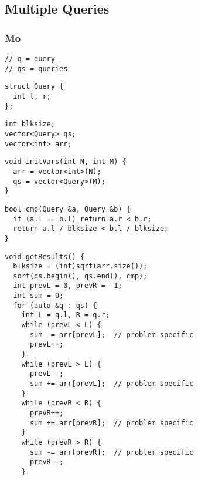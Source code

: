 \documentclass[twoside]{article}
\begin{document}
\begin{multicols*}{2}
\subsectionfont{\bfseries\sffamily\centering\LARGE}
\vspace{0em}
\subsection*{Multiple Queries}
\vspace{2em}
\subsubsectionfont{\large\bfseries\sffamily\underline}
\subsubsection*{Mo}
\begin{verbatim}
// q = query
// qs = queries
\end{verbatim}
\vspace{-12pt}
\begin{verbatim}
struct Query {
  int l, r;
};
\end{verbatim}
\vspace{-12pt}
\begin{verbatim}
int blksize;
vector<Query> qs;
vector<int> arr;
\end{verbatim}
\vspace{-12pt}
\begin{verbatim}
void initVars(int N, int M) {
  arr = vector<int>(N);
  qs = vector<Query>(M);
}
\end{verbatim}
\vspace{-12pt}
\begin{verbatim}
bool cmp(Query &a, Query &b) {
  if (a.l == b.l) return a.r < b.r;
  return a.l / blksize < b.l / blksize;
}
\end{verbatim}
\vspace{-12pt}
\begin{verbatim}
void getResults() {
  blksize = (int)sqrt(arr.size());
  sort(qs.begin(), qs.end(), cmp);
  int prevL = 0, prevR = -1;
  int sum = 0;
  for (auto &q : qs) {
    int L = q.l, R = q.r;
    while (prevL < L) {
      sum -= arr[prevL];  // problem specific
      prevL++;
    }
    while (prevL > L) {
      prevL--;
      sum += arr[prevL];  // problem specific
    }
    while (prevR < R) {
      prevR++;
      sum += arr[prevR];  // problem specific
    }
    while (prevR > R) {
      sum -= arr[prevR];  // problem specific
      prevR--;
    }


\end{verbatim}
\end{multicols*}
\end{document}
